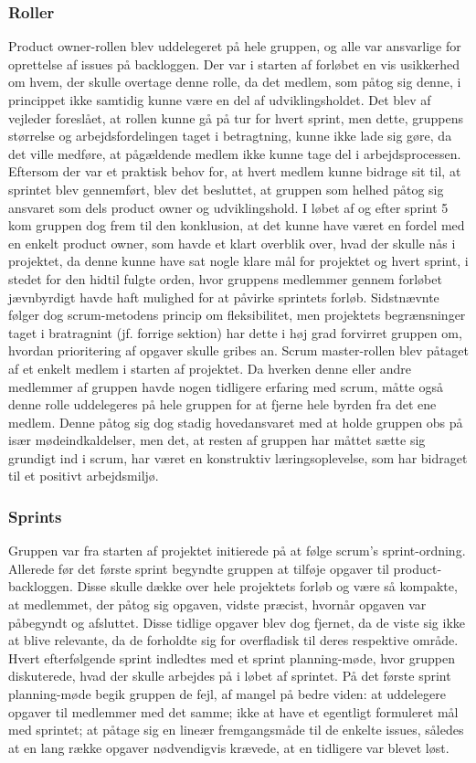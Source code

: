 \subsubsection{Roller}
Product owner-rollen blev uddelegeret på hele gruppen, og alle var ansvarlige for oprettelse af issues på backloggen. Der var i starten af forløbet en vis usikkerhed om hvem, der skulle overtage denne rolle, da det medlem, som påtog sig denne, i princippet ikke samtidig kunne være en del af udviklingsholdet. Det blev af vejleder foreslået, at rollen kunne gå på tur for hvert sprint, men dette, gruppens størrelse og arbejdsfordelingen taget i betragtning, kunne ikke lade sig gøre, da det ville medføre, at pågældende medlem ikke kunne tage del i arbejdsprocessen. Eftersom der var et praktisk behov for, at hvert medlem
kunne bidrage sit til, at sprintet blev gennemført, blev det besluttet, at gruppen som helhed påtog sig ansvaret som dels product owner og udviklingshold. I løbet af og efter sprint 5 kom gruppen dog frem til den konklusion, at det kunne have været en fordel med en enkelt product owner, som havde et klart overblik over, hvad der skulle nås i projektet, da denne kunne have sat nogle klare mål for projektet og hvert sprint, i stedet for den hidtil fulgte orden, hvor gruppens medlemmer gennem forløbet jævnbyrdigt havde haft mulighed for at påvirke sprintets forløb. Sidstnævnte følger dog scrum-metodens princip om fleksibilitet, men
projektets begrænsninger taget i bratragnint (jf. forrige sektion) har dette i høj grad forvirret gruppen om, hvordan prioritering af opgaver skulle gribes an. Scrum master-rollen blev påtaget af et enkelt medlem i starten af projektet. Da hverken denne eller andre medlemmer af gruppen havde nogen tidligere erfaring med scrum, måtte også denne rolle uddelegeres på hele gruppen for at fjerne hele byrden fra det ene medlem. Denne påtog sig dog stadig hovedansvaret med at holde gruppen
obs på især mødeindkaldelser, men det, at resten af gruppen har måttet sætte sig grundigt ind i scrum, har været en konstruktiv læringsoplevelse, som har bidraget til et positivt arbejdsmiljø.

\subsubsection{Sprints}
Gruppen var fra starten af projektet initierede på at følge scrum's sprint-ordning. Allerede før det første sprint begyndte gruppen at tilføje opgaver til product-backloggen. Disse skulle dække over hele projektets forløb og være så kompakte, at medlemmet, der påtog sig opgaven, vidste præcist, hvornår opgaven var påbegyndt og afsluttet. Disse tidlige opgaver blev dog fjernet, da de viste sig ikke at blive relevante, da de forholdte sig for overfladisk til deres respektive område. Hvert efterfølgende sprint indledtes med et sprint planning-møde, hvor gruppen diskuterede, hvad der skulle arbejdes på i løbet af sprintet. På det første sprint planning-møde begik gruppen de fejl, af mangel på bedre viden: at uddelegere opgaver til medlemmer med det samme; ikke at have et egentligt formuleret mål med sprintet; at påtage sig en lineær fremgangsmåde til de enkelte issues, således at en lang række opgaver nødvendigvis krævede, at en tidligere var blevet løst.

